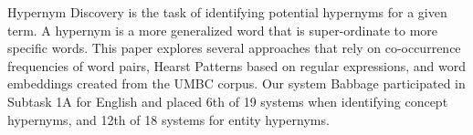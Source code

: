 Hypernym Discovery is the task of identifying potential hypernyms for a given term. A hypernym is a more generalized word that is super-ordinate to more specific words. This paper explores several approaches that rely on co-occurrence frequencies of word pairs, Hearst Patterns based on regular expressions, and word embeddings created from the UMBC corpus. Our system Babbage participated in Subtask 1A for English and placed 6th of 19 systems when identifying concept hypernyms, and 12th of 18 systems for entity hypernyms.
